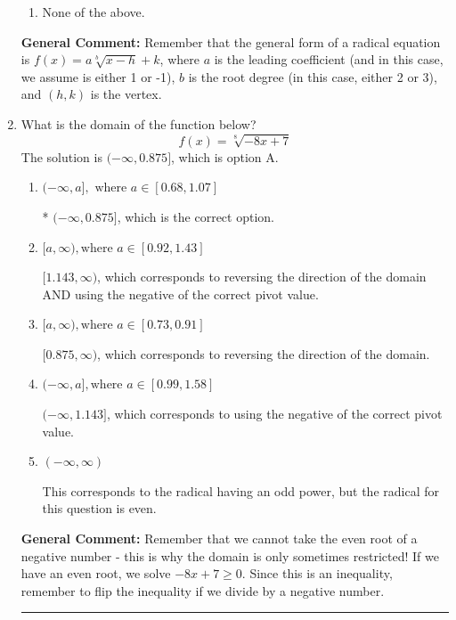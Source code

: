 \documentclass{extbook}[14pt]
\newcommand{\litem}[1]{\item #1

\rule{\textwidth}{0.4pt}}
\begin{document}
\begin{enumerate}
{\begin{enumerate}[label=\Alph*.]
\item None of the above.\end{enumerate}
\textbf{General Comment:} Remember that the general form of a radical equation is $ f(x) = a \sqrt[b]{x - h} + k $, where $a$ is the leading coefficient (and in this case, we assume is either 1 or -1), $b$ is the root degree (in this case, either 2 or 3), and $(h, k)$ is the vertex.
}
\litem{
What is the domain of the function below?
\[ f(x) = \sqrt[8]{-8 x + 7} \]The solution is \( (-\infty, 0.875] \), which is option A.\begin{enumerate}[label=\Alph*.]
\item \( (-\infty, a], \text{ where } a \in [0.68, 1.07] \)

* $(-\infty, 0.875]$, which is the correct option.
\item \( [a, \infty), \text{where } a \in [0.92, 1.43] \)

$[1.143, \infty)$, which corresponds to reversing the direction of the domain AND using the negative of the correct pivot value.
\item \( [a, \infty), \text{where } a \in [0.73, 0.91] \)

 $[0.875, \infty)$, which corresponds to reversing the direction of the domain.
\item \( (-\infty, a], \text{where } a \in [0.99, 1.58] \)

$(-\infty, 1.143]$, which corresponds to using the negative of the correct pivot value.
\item \( (-\infty, \infty) \)

This corresponds to the radical having an odd power, but the radical for this question is even.
\end{enumerate}

\textbf{General Comment:} Remember that we cannot take the even root of a negative number - this is why the domain is only sometimes restricted! If we have an even root, we solve $-8 x + 7 \geq 0$. Since this is an inequality, remember to flip the inequality if we divide by a negative number.
}
\end{enumerate}
\end{document}
